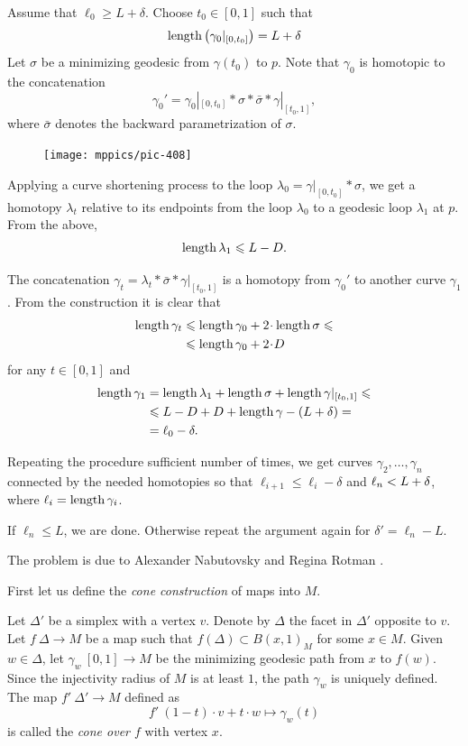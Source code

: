 Assume that $\ell_0\ge L+\delta$.
Choose $t_0\in [0,1]$ such that
\[\operatorname{\rm length}\left(\gamma_0|_{[0,t_0]}\right)=L+\delta\]
Let $\sigma$ be a minimizing geodesic from $\gamma(t_0)$
to $p$.
Note that $\gamma_0$ is homotopic to the concatenation 
\[\gamma_0'=\gamma_0|_{[0,t_0]}*\sigma*\bar\sigma*\gamma|_{[t_0,1]},\]
where $\bar\sigma$ denotes the backward parametrization of $\sigma$.

\begin{figure}
\vskip-2mm
\centering
\texttt{[image: mppics/pic-408]}
\end{figure}

Applying a curve shortening process to the loop $\lambda_0=\gamma|_{[0,t_0]}*\sigma$, 
we get a  homotopy $\lambda_t$
relative to its endpoints 
from the loop $\lambda_0$ to a geodesic loop $\lambda_1$ at $p$.
From the above, 
\[\operatorname{\rm length}\lambda_1\leqslant L-D.\]

The concatenation $\gamma_t=\lambda_t*\bar\sigma*\gamma|_{[t_0,1]}$
is a homotopy
from $\gamma_0'$ to another curve $\gamma_1$.
From the construction it is clear that 
\begin{align*}
 \length \gamma_t&\le \length \gamma_0+2\cdot \length\sigma\le
 \\
 &\le \length \gamma_0+2\cdot D
\end{align*}
for any $t\in[0,1]$
and 
\begin{align*}
 \operatorname{\rm length} \gamma_1&=\operatorname{\rm length}\lambda_1+\operatorname{\rm length}\sigma+\operatorname{\rm length}\gamma|_{[t_0,1]}\leqslant
\\ &\leqslant L-D+D+\operatorname{\rm length}\gamma-(L+\delta)=
\\ &=\ell_0 -\delta.
\end{align*}

Repeating the procedure sufficient number of times, we get curves $\gamma_2,\dots,\gamma_n$
connected by the needed homotopies so that 
$\ell_{i+1}\le\ell_i-\delta$ and $\ell_n\z< L+\delta$,
where $\ell_i=\operatorname{\rm length}\gamma_i$.

If $\ell_n\le L$, we are done.
Otherwise repeat the argument again for $\delta'=\ell_n-L$.
\qeds

The problem is due to 
Alexander Nabutovsky 
and Regina Rotman \cite{nabutovsky-rotman}.


First let us define the {}\emph{cone construction} of maps into $M$.

Let $\Delta'$ be a simplex 
with a vertex $v$.
Denote by $\Delta$ the facet in $\Delta'$ opposite to $v$.
Let $f\:\Delta\to M$ be a map such that $f(\Delta)\subset B(x,1)_M$ for some $x \in M$.
Given $w\in \Delta$, let $\gamma_w\:[0,1]\to M$ be the minimizing geodesic path from $x$ to  $f(w)$.
Since the injectivity radius of $M$ is at least $1$, the path $\gamma_w$ is uniquely defined.
The map $f'\:\Delta'\to M$ defined as 
\[f'\:(1-t)\cdot v+t\cdot w\mapsto \gamma_w(t)\] 
is called the {}\emph{cone over $f$} with vertex $x$. 

